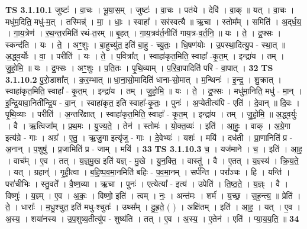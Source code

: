 \documentclass[17pt]{extarticle}
\begin{document}
                                \textbf{ TS 3.1.10.1} \newline
                  जुष्टः॑ । वा॒चः । भू॒या॒स॒म् । जुष्टः॑ । वा॒चः । पत॑ये । देवि॑ । वा॒क् ॥ यत् । वा॒चः । मधु॑म॒दिति॒ मधु॑-म॒त् । तस्मिन्न्॑ । मा॒ । धाः॒ । स्वाहा᳚ । सर॑स्वत्यै ॥ ऋ॒चा । स्तोम᳚म् । समिति॑ । अ॒द्‌र्ध॒य॒ । गा॒य॒त्रेण॑ । र॒थ॒न्त॒रमिति॑ रथं-त॒रम् ॥ बृ॒हत् । गा॒य॒त्रव॑र्त॒नीति॑ गाय॒त्र-व॒र्त॒नि॒ ॥ यः । ते॒ । द्र॒फ्सः । स्कन्द॑ति । यः । ते॒ । अꣳ॒॒शुः । बा॒हुच्यु॑त॒ इति॑ बा॒हु - च्यु॒तः॒ । धि॒षण॑योः । उ॒पस्था॒दित्यु॒प - स्था॒त् ॥ अ॒द्ध्व॒र्योः । वा॒ । परीति॑ । यः । ते॒ । प॒वित्रा᳚त् । स्वाहा॑कृत॒मिति॒ स्वाहा᳚ -कृ॒त॒म् । इन्द्रा॑य । तम् । जु॒हो॒मि॒ ॥ यः । द्र॒फ्सः । अꣳ॒॒शुः । प॒ति॒तः । पृ॒थि॒व्याम् । प॒रि॒वा॒पादिति॑ परि - वा॒पात् । \textbf{  32} \newline
                  \newline
                                \textbf{ TS 3.1.10.2} \newline
                  पु॒रो॒डाशा᳚त् । क॒र॒म्भात् ॥ धा॒ना॒सो॒मादिति॑ धाना-सो॒मात् । म॒न्थिनः॑ । इ॒न्द्र॒ । शु॒क्रात् । स्वाहा॑कृत॒मिति॒ स्वाहा᳚ - कृ॒त॒म् । इन्द्रा॑य । तम् । जु॒हो॒मि॒ ॥ यः । ते॒ । द्र॒फ्सः । मधु॑मा॒निति॒ मधु॑ - मा॒न् । इ॒न्द्रि॒यावा॒निती᳚न्द्रि॒य - वा॒न् । स्वाहा॑कृत॒ इति स्वाहा᳚-कृ॒तः॒ । पुनः॑ । अ॒प्येतीत्य॑पि - एति॑ । दे॒वान् ॥ दि॒वः । पृ॒थि॒व्याः । परीति॑ । अ॒न्तरि॑क्षात् । स्वाहा॑कृत॒मिति॒ स्वाहा᳚ - कृ॒त॒म् । इन्द्रा॑य । तम् । जु॒हो॒मि॒ ॥ अ॒द्ध्व॒र्युः । वै । ऋ॒त्विजा᳚म् । प्र॒थ॒मः । यु॒ज्य॒ते॒ । तेन॑ । स्तोमः॑ । यो॒क्त॒व्यः॑ । इति॑ । आ॒हुः॒ । वाक् । अ॒ग्रे॒गा इत्य॑ग्रे - गाः । अग्र᳚ । ए॒तु॒ । ऋ॒जु॒गा इत्यृ॑जु - गाः । दे॒वेभ्यः॑ । यशः॑ । मयि॑ । दध॑ती । प्रा॒णानिति॑ प्र - अ॒नान् । प॒शुषु॑ । प्र॒जामिति॑ प्र - जाम् । मयि॑ । \textbf{  33} \newline
                  \newline
                                \textbf{ TS 3.1.10.3} \newline
                  च॒ । यज॑माने । च॒ । इति॑ । आ॒ह॒ । वाच᳚म् । ए॒व । तत् । य॒ज्ञ्॒मु॒ख इति॑ यज्ञ् - मु॒खे । यु॒न॒क्ति॒ । वास्तु॑ । वै । ए॒तत् । य॒ज्ञ्स्य॑ । क्रि॒य॒ते॒ । यत् । ग्रहान्॑ । गृ॒ही॒त्वा । ब॒हि॒ष्प॒व॒मा॒नमिति॑ बहिः - प॒व॒मा॒नम् । सर्प॑न्ति । परा᳚ञ्चः । हि । यन्ति॑ । परा॑चीभिः । स्तु॒वते᳚ । वै॒ष्ण॒व्या । ऋ॒चा । पुनः॑ । एत्येत्या᳚ - इत्य॑ । उपेति॑ । ति॒ष्ठ॒ते॒ । य॒ज्ञ्ः । वै । विष्णुः॑ । य॒ज्ञ्म् । ए॒व । अ॒कः॒ । विष्णो॒ इति॑ । त्वम् । नः॒ । अन्त॑मः । शर्म॑ । य॒च्छ॒ । स॒ह॒न्त्य॒ ॥ प्रेति॑ । ते॒ । धाराः᳚ । म॒धु॒श्चुत॒ इति॑ मधु-श्चुतः॑ । उथ्स᳚म् । दु॒ह्र॒ते॒ ( ) । अक्षि॑तम् । इति॑ । आ॒ह॒ । यत् । ए॒व । अ॒स्य॒ । शया॑नस्य । उ॒प॒शुष्य॒तीत्यु॑प - शुष्य॑ति । तत् । ए॒व । अ॒स्य॒ । ए॒तेन॑ । एति॑ । प्या॒य॒य॒ति॒ ॥ \textbf{  34} \newline
\end{document}
